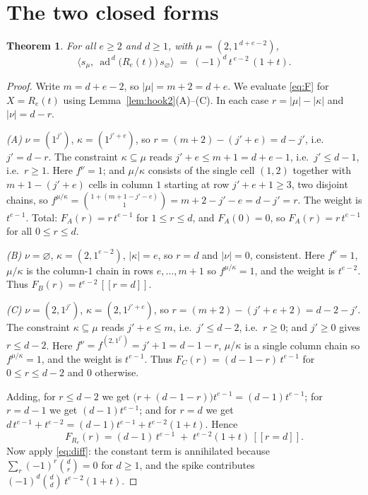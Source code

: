 \documentclass[11pt]{article}
\theoremstyle{plain}
\newtheorem{theorem}{Theorem}
\theoremstyle{definition}
\DeclareMathOperator{\ad}{ad}
\newcommand{\ind}[1]{[\![#1]\!]}
\begin{document}
\section{The two closed forms}

\begin{theorem}\label{thm:A}
For all $e\ge2$ and $d\ge1$, with $\mu=(2,1^{\,d+e-2})$,
\[
  \bigl\langle s_{\mu},\ \ad^{\,d}\bigl(R_e(t)\bigr)\,s_\varnothing\bigr\rangle
  \;=\;(-1)^{d}\,t^{\,e-2}\,(1+t).
\]
\end{theorem}

\begin{proof}
Write $m=d+e-2$, so $|\mu|=m+2=d+e$.  We evaluate \eqref{eq:F} for
$X=R_e(t)$ using Lemma~\ref{lem:hook2}(A)--(C).  In each case
$r=|\mu|-|\kappa|$ and $|\nu|=d-r$.

\emph{(A)} $\nu=(1^{j'})$, $\kappa=(1^{j'+e})$, so $r=(m+2)-(j'+e)=d-j'$, i.e.\
$j'=d-r$.  The constraint $\kappa\subseteq\mu$ reads $j'+e\le m+1=d+e-1$, i.e.\
$j'\le d-1$, i.e.\ $r\ge1$.  Here $f^{\nu}=1$; and $\mu/\kappa$ consists of the
single cell $(1,2)$ together with $m+1-(j'+e)$ cells in column $1$ starting at
row $j'+e+1\ge3$, two disjoint chains, so
$f^{\mu/\kappa}=\binom{1+(m+1-j'-e)}{1}=m+2-j'-e=d-j'=r$.  The weight is
$t^{e-1}$.  Total: $F_A(r)=r\,t^{e-1}$ for $1\le r\le d$, and $F_A(0)=0$, so
$F_A(r)=r\,t^{e-1}$ for all $0\le r\le d$.

\emph{(B)} $\nu=\varnothing$, $\kappa=(2,1^{e-2})$, $|\kappa|=e$, so $r=d$ and
$|\nu|=0$, consistent.  Here $f^{\nu}=1$, $\mu/\kappa$ is the column-$1$ chain in
rows $e,\dots,m+1$ so $f^{\mu/\kappa}=1$, and the weight is $t^{e-2}$.  Thus
$F_B(r)=t^{e-2}\,\ind{r=d}$.

\emph{(C)} $\nu=(2,1^{j'})$, $\kappa=(2,1^{j'+e})$, so $r=(m+2)-(j'+e+2)=d-2-j'$.
The constraint $\kappa\subseteq\mu$ reads $j'+e\le m$, i.e.\ $j'\le d-2$, i.e.\
$r\ge0$; and $j'\ge0$ gives $r\le d-2$.  Here $f^{\nu}=f^{(2,1^{j'})}=j'+1=d-1-r$,
$\mu/\kappa$ is a single column chain so $f^{\mu/\kappa}=1$, and the weight is
$t^{e-1}$.  Thus $F_C(r)=(d-1-r)\,t^{e-1}$ for $0\le r\le d-2$ and $0$ otherwise.

Adding, for $r\le d-2$ we get $\bigl(r+(d-1-r)\bigr)t^{e-1}=(d-1)t^{e-1}$; for
$r=d-1$ we get $(d-1)t^{e-1}$; and for $r=d$ we get
$d\,t^{e-1}+t^{e-2}=(d-1)t^{e-1}+t^{e-2}(1+t)$.  Hence
\[
  F_{R_e}(r)=(d-1)\,t^{e-1}\;+\;t^{e-2}(1+t)\,\ind{r=d}.
\]
Now apply \eqref{eq:diff}: the constant term is annihilated because
$\sum_{r}(-1)^r\binom dr=0$ for $d\ge1$, and the spike contributes
$(-1)^d\binom dd\,t^{e-2}(1+t)$.
\end{proof}
\end{document}
